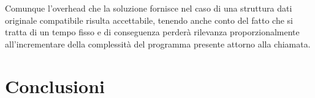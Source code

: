 \documentclass[12pt,italian]{report}
\begin{document}
	\bigbreak 
	
	Comunque l'overhead che la soluzione fornisce nel caso di una struttura dati originale compatibile risulta accettabile, tenendo anche conto del fatto che si tratta di un tempo fisso e di conseguenza perderà rilevanza proporzionalmente all'incrementare della complessità del programma presente attorno alla chiamata.
	
	\chapter{Conclusioni}
	\label{cap:conclusioni}
	
	
	
	
\end{document}
